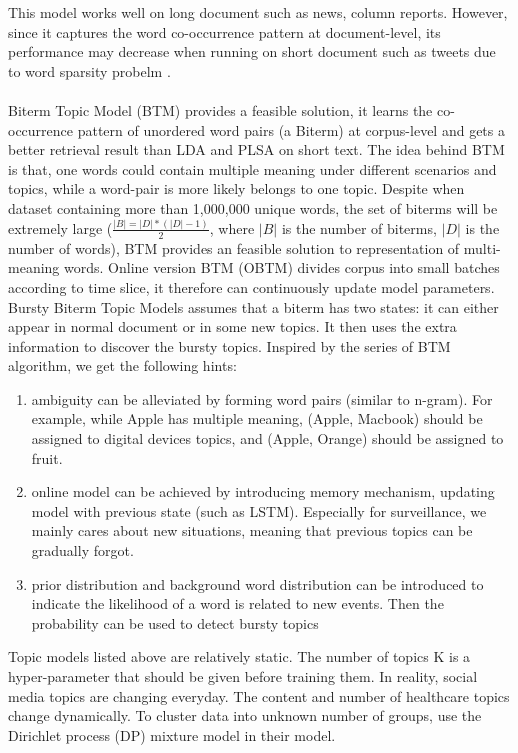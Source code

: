 This model works well on long document such as news, column reports. However, since it captures the word co-occurrence pattern at document-level, its performance may decrease when running on short document such as tweets due to word sparsity probelm \cite{yan2013biterm}. \\\\
Biterm Topic Model (BTM) \cite{yan2013biterm, cheng2014btm} provides a feasible solution, it learns the co-occurrence pattern of unordered word pairs (a Biterm) at corpus-level and gets a better retrieval result than LDA and PLSA on short text. The idea behind BTM is that, one words could contain multiple meaning under different scenarios and topics, while a word-pair is more likely belongs to one topic. Despite when dataset containing more than 1,000,000 unique words, the set of biterms will be extremely large ($\frac{|B| = |D| * (|D|-1)}{2}$, where $|B|$ is the number of biterms, $|D|$ is the number of words), BTM provides an feasible solution to representation of multi-meaning words. Online version BTM (OBTM) \cite{cheng2014btm} divides corpus into small batches according to time slice, it therefore can continuously update model parameters. Bursty Biterm Topic Models \cite{yan2015probabilistic} assumes that a biterm has two states: it can either appear in normal document or in some new topics. It then uses the extra information to discover the bursty topics. Inspired by the series of BTM algorithm, we get the following hints:
\begin{enumerate}
    \item ambiguity can be alleviated by forming word pairs (similar to n-gram). For example, while Apple has multiple meaning, (Apple, Macbook) should be assigned to digital devices topics, and (Apple, Orange) should be assigned to fruit.
    \item online model can be achieved by introducing memory mechanism, updating model with previous state (such as LSTM). Especially for surveillance, we mainly cares about new situations, meaning that previous topics can be gradually forgot.
    \item prior distribution and background word distribution can be introduced to indicate the likelihood of a word is related to new events. Then the probability can be used to detect bursty topics
\end{enumerate} 
Topic models listed above are relatively static. The number of topics K is a hyper-parameter that should be given before training them. In reality, social media topics are changing everyday. The content and number of healthcare topics change dynamically. To cluster data into unknown number of groups, \cite{teh2005sharing} use the Dirichlet process (DP) mixture model in their model.

